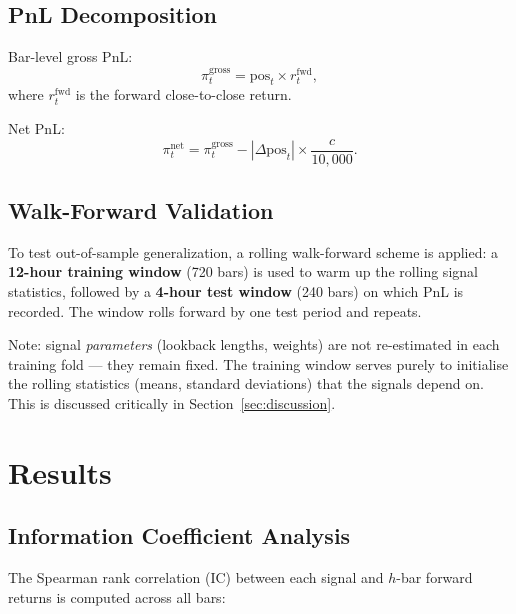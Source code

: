 \documentclass[11pt, a4paper]{article}
\begin{document}
\subsection{PnL Decomposition}

Bar-level gross PnL:
\[
\pi^{\mathrm{gross}}_t = \mathrm{pos}_t \times r^{\mathrm{fwd}}_t,
\]
where $r^{\mathrm{fwd}}_t$ is the forward close-to-close return.

Net PnL:
\[
\pi^{\mathrm{net}}_t
  = \pi^{\mathrm{gross}}_t - |\Delta \mathrm{pos}_t| \times \frac{c}{10{,}000}.
\]

\subsection{Walk-Forward Validation}

To test out-of-sample generalization, a rolling walk-forward scheme is applied:
a \textbf{12-hour training window} (720 bars) is used to warm up the rolling
signal statistics, followed by a \textbf{4-hour test window} (240 bars) on
which PnL is recorded.  The window rolls forward by one test period and repeats.

Note: signal \textit{parameters} (lookback lengths, weights) are not
re-estimated in each training fold --- they remain fixed.  The training window
serves purely to initialise the rolling statistics (means, standard deviations)
that the signals depend on.  This is discussed critically in
Section~\ref{sec:discussion}.

\section{Results}

\subsection{Information Coefficient Analysis}

The Spearman rank correlation (IC) between each signal and $h$-bar
forward returns is computed across all bars:
\end{document}
